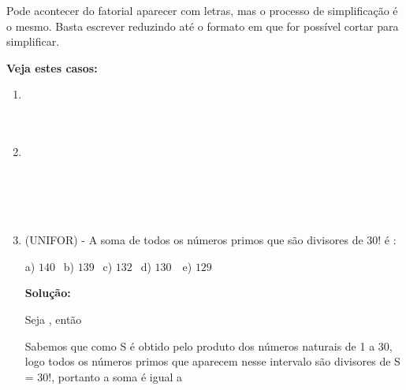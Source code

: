 \begin{multicols*}{2}
\begin{enumerate}
Pode acontecer do fatorial aparecer com letras, mas o processo de simplificação é o mesmo. Basta escrever reduzindo até o formato em que for possível cortar para simplificar.

\textbf{Veja estes casos:}

			\begin{enumerate}

			\item 	{}\\

						\\

						\\
						
			\item 	{}\\
			
						\\
						
						\\
						
						\\
						
						\\

						
			\item (UNIFOR) - A soma de todos os números primos que são divisores de 30! é :

		a) $140 \ \ $ b) $139 \ \ $ c) $132 \ \ $ d) $130 \ \ \ $ e) $129 \ \ $

\textbf{Solução:}

Seja , então


Sabemos que como S é obtido pelo produto dos números naturais de 1 a 30, logo todos os números primos que aparecem nesse intervalo são divisores de S = 30!, portanto a soma  é igual a


\end{enumerate}
\end{enumerate}
\end{multicols*}
